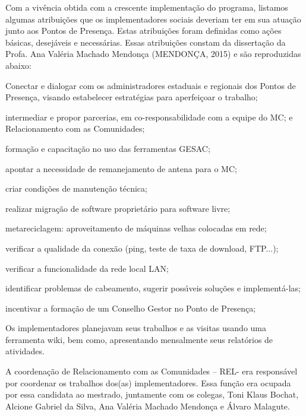 \documentclass[
12pt,		%
openright,	%
twoside,  %
a4paper,			%
chapter=TITLE,		%
english,			%
french,				%
spanish,			%
brazil				%
]{USPSC-classe/USPSC}
\begin{document}
Com a viv\^encia obtida com a crescente implementa\c{c}\~ao do programa, listamos  algumas atribui\c{c}\~oes que os implementadores sociais deveriam ter em sua atua\c{c}\~ao junto aos Pontos de Presen\c{c}a. Estas atribui\c{c}\~oes foram definidas como a\c{c}\~oes b\'asicas, desej\'aveis e necess\'arias. Essas atribui\c{c}\~oes constam da disserta\c{c}\~ao da Profa. Ana Val\'eria Machado Mendon\c{c}a  (MENDON\c{C}A, 2015) e s\~ao reproduzidas abaixo:





\begin{alineas}
\item Conectar e dialogar com os administradores estaduais e regionais dos Pontos de Presen\c{c}a, visando estabelecer estrat\'egias para aperfei\c{c}oar o trabalho;
\item intermediar e propor parcerias, em co-responsabilidade com a equipe do MC; e Relacionamento com as Comunidades;
\item forma\c{c}\~ao e capacita\c{c}\~ao no uso das ferramentas GESAC;
\item apontar a  necessidade de remanejamento de antena para o MC;
\item criar condi\c{c}\~oes de manuten\c{c}\~ao t\'ecnica;
\item realizar migra\c{c}\~ao de software propriet\'ario para software livre;
\item metareciclagem: aproveitamento de m\'aquinas velhas colocadas em rede;
\item verificar a qualidade da conex\~ao (ping, teste de taxa de download, FTP...);
\item verificar a funcionalidade da rede local LAN;
\item identificar problemas de cabeamento, sugerir poss\'{\i}veis solu\c{c}\~oes e implement\'a-las;
\item incentivar a forma\c{c}\~ao de um Conselho Gestor no Ponto de Presen\c{c}a;
\end{alineas}

Os implementadores planejavam seus trabalhos e as visitas usando uma ferramenta wiki, bem como, apresentando mensalmente seus relat\'orios de atividades.




A coordena\c{c}\~ao de Relacionamento com as Comunidades – REL- era respons\'avel por coordenar os trabalhos dos(as) implementadores. Essa fun\c{c}\~ao era ocupada por essa candidata ao mestrado,  juntamente com os colegas, Toni Klaus Bochat, Alcione  Gabriel da Silva, Ana Val\'eria Machado Mendon\c{c}a e \'Alvaro Malagute.
\end{document}
